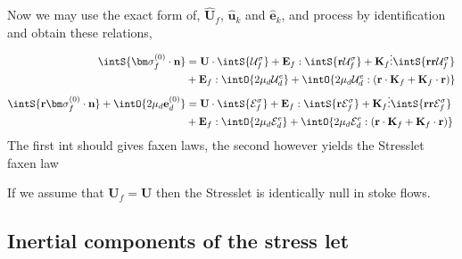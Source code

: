 Now we may use the exact form of, $\hat{\textbf{U}}_f$, $\hat{\textbf{u}}_k$ and $\hat{\textbf{e}}_k$, and process by identification and obtain these relations, 
\begin{align*}
    \intS{  \bm\sigma_f^{(0)} \cdot \textbf{n}}
    &= 
    \textbf{U}\cdot \intS{   \mathcal{U}_f^\sigma}
    + \textbf{E}_f : \intS{  \textbf{r} \mathcal{U}_f^\sigma}
    + \textbf{K}_f \vdots \intS{  \textbf{rr} \mathcal{U}_f^\sigma}\\
    &
    +\textbf{E}_f : \intO{ 2\mu_d  \mathcal{U}_d^e } 
    +\intO{ 2\mu_d \mathcal{U}_d^e :   (\textbf{r} \cdot \textbf{K}_f +\textbf{K}_f\cdot \textbf{r}) } 
    \\
    \intS{  \textbf{r}\bm\sigma_f^{(0)} \cdot \textbf{n}}
    + \intO{2\mu_d \textbf{e}_d^{(0)}}
    &= 
    \textbf{U}\cdot \intS{   \mathcal{E}_f^\sigma}
    + \textbf{E}_f : \intS{  \textbf{r} \mathcal{E}_f^\sigma}
    + \textbf{K}_f \vdots \intS{  \textbf{rr} \mathcal{E}_f^\sigma}\\
    &
    +\textbf{E}_f : \intO{ 2\mu_d  \mathcal{E}_d^e } 
    +\intO{ 2\mu_d \mathcal{E}_d^e :   (\textbf{r} \cdot \textbf{K}_f +\textbf{K}_f\cdot \textbf{r}) } 
    \\
\end{align*}
The first int should gives faxen laws, the second however yields the Stresslet faxen law

If we assume that $\textbf{U}_f = \textbf{U}$ then the Stresslet is identically null in stoke flows. 

\subsection{Inertial components of the stress let}

